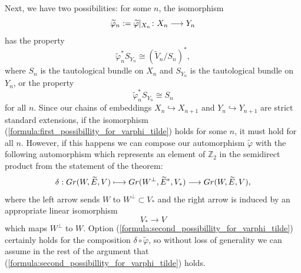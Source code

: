 \documentclass[11pt, a4paper]{article}
\begin{document}
Next, we have two possibilities: for some $n$, the isomorphism \begin{equation*}
    \widetilde{\varphi}_n:=\widetilde{\varphi}|_{X_n}\colon X_n\longrightarrow Y_n
\end{equation*}
has the property \begin{equation}\label{formula:first_possibillity_for_varphi_tilde}
    \widetilde{\varphi}^*_nS_{Y_n}\cong \left(\widetilde{V}_n/S_n\right)^*,
\end{equation}
where $S_n$ is the tautological bundle on $X_n$ and $S_{Y_n}$ is the tautological bundle on $Y_n$, or the property \begin{equation}\label{formula:second_possibillity_for_varphi_tilde}
    \widetilde{\varphi}^*_nS_{Y_n}\cong S_n
\end{equation}
for all $n$. Since our chains of embeddings $X_n\hookrightarrow X_{n+1}$ and $Y_n\hookrightarrow Y_{n+1}$ are strict standard extensions, if the isomorphism (\ref{formula:first_possibillity_for_varphi_tilde}) holds for some $n$, it must hold for all $n$. However, if this happens we can compose our automorphism $\widetilde{\varphi}$ with the following automorphism which represents an element of $\mathbb{Z}_2$ in the semidirect product from the statement of the theorem:\begin{equation*}
    \delta:Gr(W,\widetilde{E},V)\longmapsto Gr(W^{\perp},\widetilde{E}^*,V_*)\longrightarrow Gr(W,\widetilde{E},V),
\end{equation*}
where the left arrow sends $W$ to $W^{\perp}\subset V_*$ and the right arrow is induced by an appropriate linear isomorphism \begin{equation*}
    V_*\longrightarrow V%
\end{equation*} 
which maps $W^{\perp}$ to $W$. Option (\ref{formula:second_possibillity_for_varphi_tilde}) certainly holds for the composition $\delta \circ \widetilde{\varphi}$, so without loss of generality we can assume in the rest of the argument that (\ref{formula:second_possibillity_for_varphi_tilde}) holds.
\end{document}

